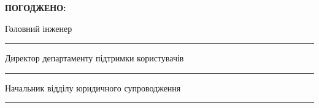 \documentclass[12pt]{article}
\begin{document}
\vspace{0.8cm}
\noindent
\textbf{ПОГОДЖЕНО:}

\vspace{0.5cm}
\noindent
\parbox[t]{0.5\textwidth}{Головний інженер}%
\parbox[t]{0.5\textwidth}{\raggedleft{} \rule{4cm}{0.5pt}}

\vspace{0.8cm}
\noindent
\parbox[t]{0.5\textwidth}{Директор департаменту підтримки користувачів}%
\parbox[t]{0.5\textwidth}{\raggedleft{} \rule{4cm}{0.5pt}}

\vspace{0.8cm}
\noindent
\parbox[t]{0.5\textwidth}{Начальник відділу юридичного супроводження}%
\parbox[t]{0.5\textwidth}{\raggedleft{} \rule{4cm}{0.5pt}}
\end{document}
